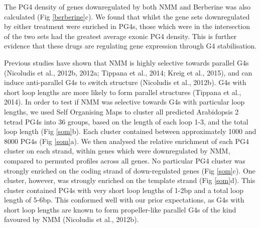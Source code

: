\documentclass[12pt,a4paper,]{report}
\let\origfigure=\figure
\let\endorigfigure=\endfigure
\renewenvironment{figure}[1][2] {
    \expandafter\origfigure\expandafter[H]
} {
    \endorigfigure
}
\begin{document}
\begin{figure}[htbp]
\end{figure}

\newpage

The PG4 density of genes downregulated by both NMM and Berberine was
also calculated (Fig \ref{berberine}c). We found that whilst the gene
sets downregulated by either treatment were enriched in PG4s, those
which were in the intersection of the two sets had the greatest average
exonic PG4 density. This is further evidence that these drugs are
regulating gene expression through G4 stabilisation.

Previous studies have shown that NMM is highly selective towards
parallel G4s (Nicoludis et al., 2012b, 2012a; Tippana et al., 2014;
Kreig et al., 2015), and can induce anti-parallel G4s to switch
structure (Nicoludis et al., 2012b). G4s with short loop lengths are
more likely to form parallel structures (Tippana et al., 2014). In order
to test if NMM was selective towards G4s with particular loop lengths,
we used Self Organising Maps to cluster all predicted Arabidopsis 2
tetrad PG4s into 36 groups, based on the length of each loop 1-3, and
the total loop length (Fig \ref{som}b). Each cluster contained between
approximately 1000 and 8000 PG4s (Fig \ref{som}a). We then analysed the
relative enrichment of each PG4 cluster on each strand, within genes
which were downregulated by NMM, compared to permuted profiles across
all genes. No particular PG4 cluster was strongly enriched on the coding
strand of down-regulated genes (Fig \ref{som}c). One cluster, however,
was strongly enriched on the template strand (Fig \ref{som}d). This
cluster contained PG4s with very short loop lengths of 1-2bp and a total
loop length of 5-6bp. This conformed well with our prior expectations,
as G4s with short loop lengths are known to form propeller-like parallel
G4s of the kind favoured by NMM (Nicoludis et al., 2012b).

\newpage
\end{document}
